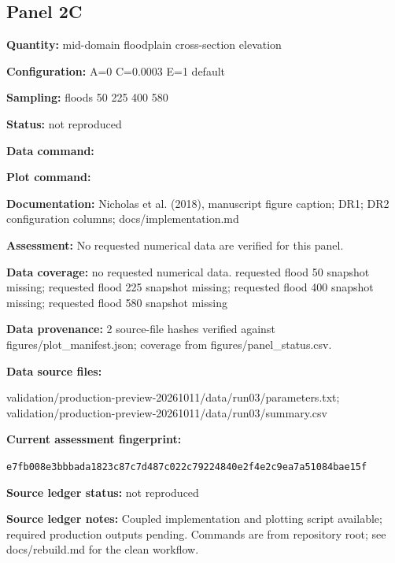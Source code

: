 \subsection*{Panel 2C}
\textbf{Quantity:} mid-domain floodplain cross-section elevation

\textbf{Configuration:} A=0 C=0.0003 E=1 default

\textbf{Sampling:} floods 50 225 400 580

\textbf{Status:} not reproduced

\textbf{Data command:}\par {\small \texttt{}}\par

\textbf{Plot command:}\par {\small \texttt{}}\par

\textbf{Documentation:} Nicholas et al. (2018), manuscript figure caption; DR1; DR2 configuration columns; docs/\allowbreak{}implementation.md

\textbf{Assessment:} No requested numerical data are verified for this panel.

\textbf{Data coverage:} no requested numerical data. requested flood 50 snapshot missing; requested flood 225 snapshot missing; requested flood 400 snapshot missing; requested flood 580 snapshot missing

\textbf{Data provenance:} 2 source-file hashes verified against figures/\allowbreak{}plot\_\allowbreak{}manifest.json; coverage from figures/\allowbreak{}panel\_\allowbreak{}status.csv.

\textbf{Data source files:}\par {\small\raggedright validation/\allowbreak{}production-preview-20261011/\allowbreak{}data/\allowbreak{}run03/\allowbreak{}parameters.txt; validation/\allowbreak{}production-preview-20261011/\allowbreak{}data/\allowbreak{}run03/\allowbreak{}summary.csv\par}

\textbf{Current assessment fingerprint:}\par {\small\texttt{e7fb008e3bbbada1823c87c7d487c022c79224840e2f4e2c9ea7a51084bae15f}}\par

\textbf{Source ledger status:} not reproduced

\textbf{Source ledger notes:} Coupled implementation and plotting script available; required production outputs pending. Commands are from repository root; see docs/\allowbreak{}rebuild.md for the clean workflow.

